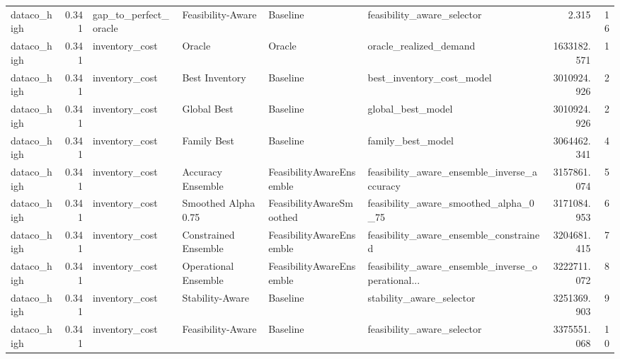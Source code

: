 \begin{table}
{\begin{tabular}{lrllllrr}
   dataco\_high &             0.341 &       gap\_to\_perfect\_oracle &     Feasibility-Aware &                  Baseline &                         feasibility\_aware\_selector &         2.315 &              16 \\
   dataco\_high &             0.341 &              inventory\_cost &                Oracle &                    Oracle &                             oracle\_realized\_demand &   1633182.571 &               1 \\
   dataco\_high &             0.341 &              inventory\_cost &        Best Inventory &                  Baseline &                          best\_inventory\_cost\_model &   3010924.926 &               2 \\
   dataco\_high &             0.341 &              inventory\_cost &           Global Best &                  Baseline &                                  global\_best\_model &   3010924.926 &               2 \\
   dataco\_high &             0.341 &              inventory\_cost &           Family Best &                  Baseline &                                  family\_best\_model &   3064462.341 &               4 \\
   dataco\_high &             0.341 &              inventory\_cost &     Accuracy Ensemble &  FeasibilityAwareEnsemble &        feasibility\_aware\_ensemble\_inverse\_accuracy &   3157861.074 &               5 \\
   dataco\_high &             0.341 &              inventory\_cost &   Smoothed Alpha 0.75 &  FeasibilityAwareSmoothed &              feasibility\_aware\_smoothed\_alpha\_0\_75 &   3171084.953 &               6 \\
   dataco\_high &             0.341 &              inventory\_cost &  Constrained Ensemble &  FeasibilityAwareEnsemble &             feasibility\_aware\_ensemble\_constrained &   3204681.415 &               7 \\
   dataco\_high &             0.341 &              inventory\_cost &  Operational Ensemble &  FeasibilityAwareEnsemble &  feasibility\_aware\_ensemble\_inverse\_operational... &   3222711.072 &               8 \\
   dataco\_high &             0.341 &              inventory\_cost &       Stability-Aware &                  Baseline &                           stability\_aware\_selector &   3251369.903 &               9 \\
   dataco\_high &             0.341 &              inventory\_cost &     Feasibility-Aware &                  Baseline &                         feasibility\_aware\_selector &   3375551.068 &              10 \\

\end{tabular}}
\end{table}

